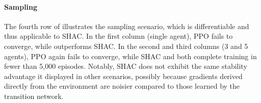 \paragraph{Sampling}
The fourth row of  illustrates the sampling scenario, which is differentiable and thus applicable to SHAC\@. In the first column (single agent), PPO fails to converge, while \fname{} outperforms SHAC\@. In the second and third columns (3 and 5 agents), PPO again fails to converge, while SHAC and \fname{} both complete training in fewer than 5,000 episodes. Notably, SHAC does not exhibit the same stability advantage it displayed in other scenarios, possibly because gradients derived directly from the environment are noisier compared to those learned by the transition network.
